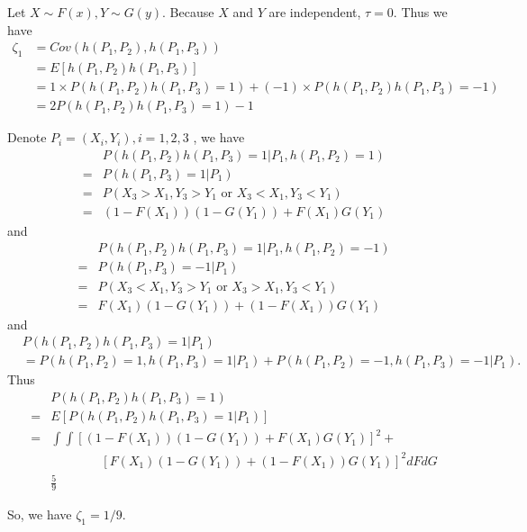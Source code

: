 \begin{solution}
    Let $X\sim F(x), Y\sim G(y)$. Because $X$ and $Y$ are independent, $\tau = 0$. 
    Thus we have
    \begin{equation*}
        \begin{split}
            \zeta_1 & = Cov (h(P_1, P_2), h(P_1, P_3)) \\
            & = E[h(P_1, P_2) h(P_1, P_3)] \\
            & = 1\times P(h(P_1, P_2) h(P_1, P_3)=1) + (-1) \times P(h(P_1, P_2) h(P_1, P_3)=-1) \\
            & = 2P(h(P_1, P_2) h(P_1, P_3)=1)-1
        \end{split}
    \end{equation*}

    Denote $P_i = (X_i,Y_i), i=1,2,3$ , we have
    \begin{equation*}
        \begin{split}
            &  P(h(P_1, P_2) h(P_1, P_3)=1   |P_1, h(P_1, P_2)=1) \\
            = & P(h(P_1, P_3)=1|P_1) \\
            = & P(X_3>X_1, Y_3>Y_1 \text{ or } X_3<X_1, Y_3<Y_1) \\
            = & (1-F(X_1))(1-G(Y_1)) + F(X_1)G(Y_1)
        \end{split}
    \end{equation*}
    and
    \begin{equation*}
        \begin{split}
            &  P(h(P_1, P_2) h(P_1, P_3)=1   | P_1, h(P_1, P_2)=-1) \\
            = & P(h(P_1, P_3)=-1 | P_1) \\
            = & P(X_3<X_1, Y_3>Y_1 \text{ or } X_3>X_1, Y_3<Y_1) \\
            = & F(X_1)(1-G(Y_1)) + (1-F(X_1))G(Y_1)
        \end{split}
    \end{equation*}
    and
    \begin{equation*}
        \begin{split}
            & P(h(P_1, P_2) h(P_1, P_3)=1 |  P_1) \\
            &= P(h(P_1, P_2)=1, h(P_1, P_3)=1 |  P_1) + P(h(P_1, P_2)=-1, h(P_1, P_3)=-1 |  P_1) .
        \end{split}
    \end{equation*}
    Thus
    \begin{equation*}
        \begin{split}
            & P(h(P_1, P_2) h(P_1, P_3)=1) \\
            = & E[P(h(P_1, P_2) h(P_1, P_3)=1 |  P_1)]\\
            = & \int\int [(1-F(X_1))(1-G(Y_1)) + F(X_1)G(Y_1)]^2 + \\
            & \quad\quad\quad\quad [F(X_1)(1-G(Y_1)) + (1-F(X_1))G(Y_1)]^2 d F d G \\
            & \frac{5}{9}
        \end{split}
    \end{equation*}

    So, we have $\zeta_1=1/9$.
\end{solution}
